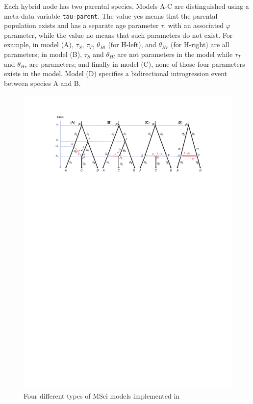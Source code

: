 \documentclass[a4paper]{book}
\numberwithin{equation}{section} \renewcommand{\baselinestretch}{0.55}
\begin{document}
Each hybrid node has two parental species.  Models A-C are
distinguished using a meta-data variable \texttt{tau-parent}.  The
value yes means that the parental population exists and has a separate
age parameter $\tau$, with an associated $\varphi$ parameter, while
the value no means that such parameters do not exist.  For example, in
model (A), $\tau_S$, $\tau_T$, $\theta_{Hl}$ (for H-left), and
$\theta_{Hr}$ (for H-right) are all parameters; in model (B), $\tau_S$
and $\theta_{Hl}$ are not parameters in the model while $\tau_T$ and
$\theta_{Hr}$ are parameters; and finally in model (C), none of those
four parameters exists in the model.  Model (D) specifies a
bidirectional introgression event between species A and B.
\begin{figure} [t]
  \centering \includegraphics[scale=0.7890]{figures/fig-msci-models}
  \caption{Four different types of MSci models implemented in
}
\end{figure}
\end{document}

